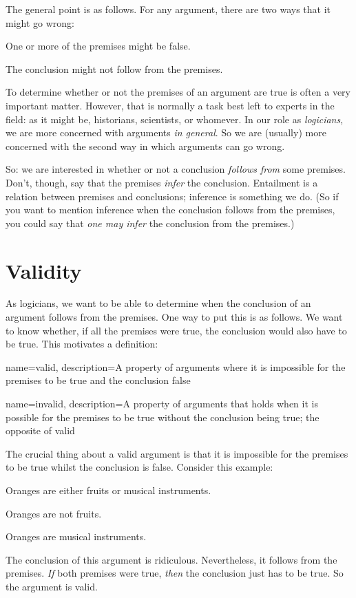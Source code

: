 The general point is as follows. For any argument, there are two ways that it might go wrong:
	\begin{ebullet}
		\item One or more of the premises might be false. 
		\item The conclusion might not follow from the premises.
	\end{ebullet}
To determine whether or not the premises of an argument are true is often a very important matter. However, that is normally a task best left to experts in the field: as it might be, historians, scientists, or whomever. In our role as \emph{logicians}, we are more concerned with arguments \emph{in general}. So we are (usually) more concerned with the second way in which arguments can go wrong.

So: we are interested in whether or not a conclusion \emph{follows from} some premises. Don't, though, say that the premises \emph{infer} the conclusion. Entailment is a relation between premises and conclusions; inference is something we do. (So if you want to mention inference when the conclusion follows from the premises, you could say that \emph{one may infer} the conclusion from the premises.)

\section{Validity}

As logicians, we want to be able to determine when the conclusion of an argument follows from the premises. One way to put this is as follows. We want to know whether, if all the premises were true, the conclusion would also have to be true. This motivates a definition:

{
name=valid,
description={A property of arguments where it is impossible for the premises to be true and the conclusion false}
}

{
name=invalid,
description={A property of arguments that holds when it is possible for the premises to be true without the conclusion being true; the opposite of \gls{valid}}
}
        
The crucial thing about a valid argument is that it is impossible for the premises to be true whilst the conclusion is false. Consider this example:
	\begin{earg}
		\item[] Oranges are either fruits or musical instruments.
		\item[] Oranges are not fruits.
		\item[\therefore] Oranges are musical instruments.
	\end{earg}
The conclusion of this argument is ridiculous. Nevertheless, it follows from the premises. \emph{If} both premises were true, \emph{then} the conclusion just has to be true. So the argument is valid. 

